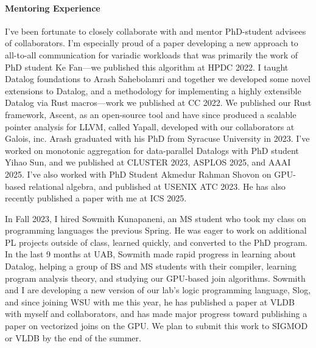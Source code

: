 \documentclass[12pt]{article}
\begin{document}
\paragraph{Mentoring Experience}

I've been fortunate to closely collaborate with and mentor PhD-student advisees of collaborators. I'm especially proud of a paper developing a new approach to all-to-all communication for variadic workloads that was primarily the work of PhD student Ke Fan---we published this algorithm at HPDC 2022. I taught Datalog foundations to Arash Sahebolamri and together we developed some novel extensions to Datalog, and a methodology for implementing a highly extensible Datalog via Rust macros---work we published at CC 2022. We published our Rust framework, Ascent, as an open-source tool and have since produced a scalable pointer analysis for LLVM, called Yapall, developed with our collaborators at Galois, inc. Arash graduated with his PhD from Syracuse University in 2023. I've worked on monotonic aggregation for data-parallel Datalogs with PhD student Yihao Sun, and we published at CLUSTER 2023, ASPLOS 2025, and AAAI 2025. I've also worked with PhD Student Akmedur Rahman Shovon on GPU-based relational algebra, and published at USENIX ATC 2023. He has also recently published a paper with me at ICS 2025.



In Fall 2023, I hired Sowmith Kunapaneni, an MS student who took my class on programming languages the previous Spring. He was eager to work on additional PL projects outside of class, learned quickly, and converted to the PhD program. In the last 9 months at UAB, Sowmith made rapid progress in learning about Datalog, helping a group of BS and MS students with their compiler, learning program analysis theory, and studying our GPU-based join algorithms. Sowmith and I are developing a new version of our lab's logic programming language, Slog, and since joining WSU with me this year, he has published a paper at VLDB with myself and collaborators, and has made major progress toward publishing a paper on vectorized joins on the GPU. We plan to submit this work to SIGMOD or VLDB by the end of the summer.
\end{document}
